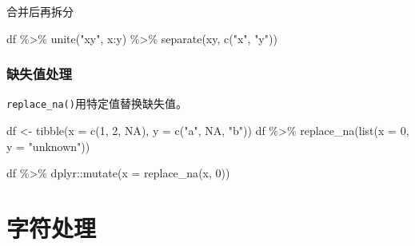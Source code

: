 \documentclass[
]{book}
\newenvironment{Shaded}{\begin{snugshade}}{\end{snugshade}}
\newcommand{\AttributeTok}[1]{\textcolor[rgb]{0.77,0.63,0.00}{#1}}
\newcommand{\ConstantTok}[1]{\textcolor[rgb]{0.00,0.00,0.00}{#1}}
\newcommand{\DecValTok}[1]{\textcolor[rgb]{0.00,0.00,0.81}{#1}}
\newcommand{\FunctionTok}[1]{\textcolor[rgb]{0.00,0.00,0.00}{#1}}
\newcommand{\NormalTok}[1]{#1}
\newcommand{\OtherTok}[1]{\textcolor[rgb]{0.56,0.35,0.01}{#1}}
\newcommand{\SpecialCharTok}[1]{\textcolor[rgb]{0.00,0.00,0.00}{#1}}
\newcommand{\StringTok}[1]{\textcolor[rgb]{0.31,0.60,0.02}{#1}}
\begin{document}
合并后再拆分

\begin{Shaded}
\begin{Highlighting}[]
\NormalTok{df }\SpecialCharTok{\%\textgreater{}\%}
  \FunctionTok{unite}\NormalTok{(}\StringTok{"xy"}\NormalTok{, x}\SpecialCharTok{:}\NormalTok{y) }\SpecialCharTok{\%\textgreater{}\%}
  \FunctionTok{separate}\NormalTok{(xy, }\FunctionTok{c}\NormalTok{(}\StringTok{"x"}\NormalTok{, }\StringTok{"y"}\NormalTok{))}
\end{Highlighting}
\end{Shaded}

\hypertarget{ux7f3aux5931ux503cux5904ux7406}{%
\subsection{缺失值处理}\label{ux7f3aux5931ux503cux5904ux7406}}

\texttt{replace\_na()}用特定值替换缺失值。

\begin{Shaded}
\begin{Highlighting}[]
\NormalTok{df }\OtherTok{\textless{}{-}} \FunctionTok{tibble}\NormalTok{(}\AttributeTok{x =} \FunctionTok{c}\NormalTok{(}\DecValTok{1}\NormalTok{, }\DecValTok{2}\NormalTok{, }\ConstantTok{NA}\NormalTok{), }\AttributeTok{y =} \FunctionTok{c}\NormalTok{(}\StringTok{"a"}\NormalTok{, }\ConstantTok{NA}\NormalTok{, }\StringTok{"b"}\NormalTok{))}
\NormalTok{df }\SpecialCharTok{\%\textgreater{}\%} \FunctionTok{replace\_na}\NormalTok{(}\FunctionTok{list}\NormalTok{(}\AttributeTok{x =} \DecValTok{0}\NormalTok{, }\AttributeTok{y =} \StringTok{"unknown"}\NormalTok{))}
\end{Highlighting}
\end{Shaded}

\begin{Shaded}
\begin{Highlighting}[]
\NormalTok{df }\SpecialCharTok{\%\textgreater{}\%}\NormalTok{ dplyr}\SpecialCharTok{::}\FunctionTok{mutate}\NormalTok{(}\AttributeTok{x =} \FunctionTok{replace\_na}\NormalTok{(x, }\DecValTok{0}\NormalTok{))}
\end{Highlighting}
\end{Shaded}

\hypertarget{character:handling}{%
\chapter{字符处理}\label{character:handling}}
\end{document}
